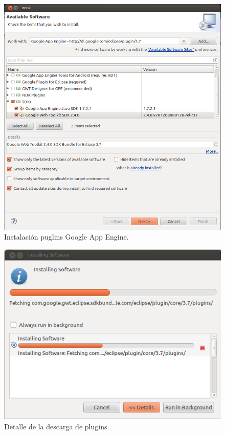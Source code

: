 \begin{figure}
  \centering
    \includegraphics[scale=0.6]{./ConfiguracionEclipse/imagenes/instalacionGAE.png}
  \caption{Instalación puglins Google App Engine.}
  \label{fig:instalacionGAE}
\end{figure}

\begin{figure}
  \centering
    \includegraphics[scale=0.6]{./ConfiguracionEclipse/imagenes/instalacionPlugins.png}
  \caption{Detalle de la descarga de plugins.}
  \label{fig:instalacionPlugins}
\end{figure}

